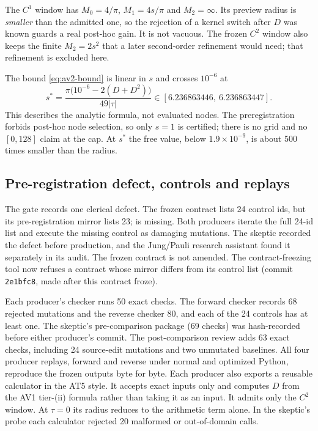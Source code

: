 The $C^1$ window has $M_0=4/\pi$, $M_1=4s/\pi$ and $M_2=\infty$. Its preview
radius is \emph{smaller} than the admitted one, so the rejection of a kernel
switch after $D$ was known guards a real post-hoc gain. It is not vacuous. The
frozen $C^2$ window also keeps the finite $M_2=2s^2$ that a later
second-order refinement would need; that refinement is excluded here.

The bound \eqref{eq:av2-bound} is linear in $s$ and crosses $10^{-6}$ at
\begin{equation}
 s^*=\frac{\pi\bigl(10^{-6}-2(D+D^2)\bigr)}{49|\tau|}\in[6.236863446,\ 6.236863447].
 \label{eq:av2-crossover}
\end{equation}
This describes the analytic formula, not evaluated nodes. The preregistration
forbids post-hoc node selection, so only $s=1$ is certified; there is no grid
and no $[0,128]$ claim at the cap. At $s^*$ the free value, below
$1.9\times10^{-9}$, is about 500 times smaller than the radius.

\subsection{Pre-registration defect, controls and replays}
\label{sec:av2-evidence}
The gate records one clerical defect. The frozen contract lists 24 control ids,
but its pre-registration mirror lists 23;  is
missing. Both producers iterate the full 24-id list and execute the missing
control as damaging mutations. The skeptic recorded the defect before
production, and the Jung/Pauli research assistant found it separately in its
audit. The frozen contract is not amended. The contract-freezing tool
now refuses a contract whose mirror differs from its control list (commit
\texttt{2e1bfc8}, made after this contract froze).

Each producer's checker runs 50 exact checks. The forward checker records 68
rejected mutations and the reverse checker 80, and each of the 24 controls has
at least one. The skeptic's pre-comparison package (69 checks) was
hash-recorded before either producer's commit. The post-comparison review adds
63 exact checks, including 24 source-edit mutations and two unmutated
baselines. All four producer replays, forward and reverse under normal and
optimized Python, reproduce the frozen outputs byte for byte. Each producer
also exports a reusable calculator in the AT5 style. It accepts exact inputs
only and computes $D$ from the AV1 tier-(ii) formula rather than taking it as
an input. It admits only the $C^2$ window. At $\tau=0$ its radius reduces to
the arithmetic term alone. In the skeptic's probe each calculator rejected 20
malformed or out-of-domain calls.

